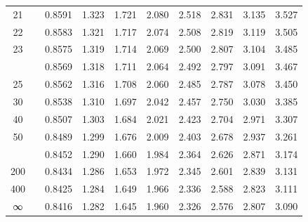 \documentclass[
]{book}
\begin{document}
\begin{tabular}{cccccccccc}
21 &  & 0.8591 & 1.323 & 1.721 & 2.080 & 2.518 & 2.831 & 3.135 & 3.527\\
22 &  & 0.8583 & 1.321 & 1.717 & 2.074 & 2.508 & 2.819 & 3.119 & 3.505\\
23 &  & 0.8575 & 1.319 & 1.714 & 2.069 & 2.500 & 2.807 & 3.104 & 3.485\\
\addlinespace
24 &  & 0.8569 & 1.318 & 1.711 & 2.064 & 2.492 & 2.797 & 3.091 & 3.467\\
25 &  & 0.8562 & 1.316 & 1.708 & 2.060 & 2.485 & 2.787 & 3.078 & 3.450\\
30 &  & 0.8538 & 1.310 & 1.697 & 2.042 & 2.457 & 2.750 & 3.030 & 3.385\\
40 &  & 0.8507 & 1.303 & 1.684 & 2.021 & 2.423 & 2.704 & 2.971 & 3.307\\
50 &  & 0.8489 & 1.299 & 1.676 & 2.009 & 2.403 & 2.678 & 2.937 & 3.261\\
\addlinespace
100 &  & 0.8452 & 1.290 & 1.660 & 1.984 & 2.364 & 2.626 & 2.871 & 3.174\\
200 &  & 0.8434 & 1.286 & 1.653 & 1.972 & 2.345 & 2.601 & 2.839 & 3.131\\
400 &  & 0.8425 & 1.284 & 1.649 & 1.966 & 2.336 & 2.588 & 2.823 & 3.111\\
∞ &  & 0.8416 & 1.282 & 1.645 & 1.960 & 2.326 & 2.576 & 2.807 & 3.090\\
\bottomrule
\end{tabular}

  
\end{document}
